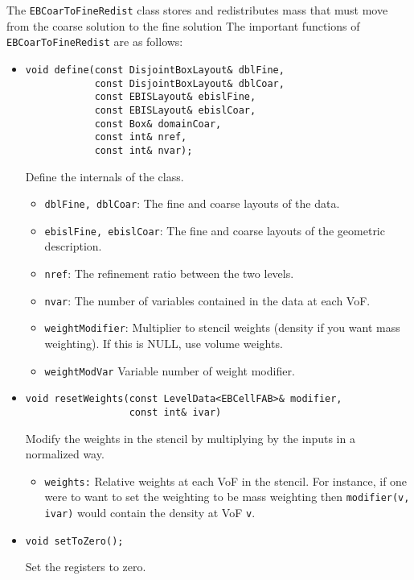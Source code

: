 The {\tt EBCoarToFineRedist} class stores and redistributes mass
that must move from the coarse solution to the fine solution
The important functions of {\tt EBCoarToFineRedist} are as follows:
\begin{itemize}
\item \begin{small}\begin{verbatim}
void define(const DisjointBoxLayout& dblFine,
            const DisjointBoxLayout& dblCoar,
            const EBISLayout& ebislFine,
            const EBISLayout& ebislCoar,
            const Box& domainCoar,
            const int& nref,
            const int& nvar);
\end{verbatim}\end{small}
Define the internals of the class. 
\begin{itemize}
\item {\tt dblFine, dblCoar}: The fine and coarse layouts
        of the data.
\item {\tt ebislFine, ebislCoar}: The fine and coarse layouts
        of the geometric description.
\item {\tt nref}: The refinement ratio between the two levels.
\item {\tt nvar}: The number of variables contained in the data
        at each VoF.
\item {\tt weightModifier}: Multiplier to stencil weights (density
        if you want mass weighting).  If this is NULL, use
        volume weights.
\item {\tt weightModVar} Variable number of weight modifier.
\end{itemize}

\item \begin{small}\begin{verbatim}
void resetWeights(const LevelData<EBCellFAB>& modifier,
                  const int& ivar)
\end{verbatim}\end{small}
Modify the weights in the stencil by multiplying by
the inputs in a normalized way.
\begin{itemize}
\item {\tt weights:}  Relative weights at each VoF in the
stencil.  For instance, if one were to want to set the 
weighting to be mass weighting then {\tt modifier(v, ivar)}
would contain the density at VoF {\tt v}.
\end{itemize}

\item \begin{small}\begin{verbatim}
void setToZero();
\end{verbatim}\end{small}
Set the registers to zero.


\end{itemize}
